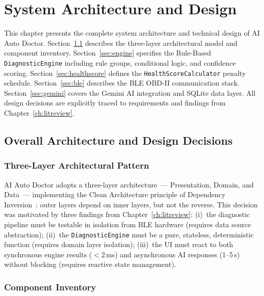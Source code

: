 \chapter{System Architecture and Design}
\label{ch:architecture}

This chapter presents the complete system architecture and technical design of AI Auto Doctor.
Section~\ref{sec:overall_arch} describes the three-layer architectural model and component inventory.
Section~\ref{sec:engine} specifies the Rule-Based \texttt{DiagnosticEngine} including rule groups, conditional logic, and confidence scoring.
Section~\ref{sec:healthscore} defines the \texttt{HealthScoreCalculator} penalty schedule.
Section~\ref{sec:ble} describes the BLE OBD-II communication stack.
Section~\ref{sec:gemini} covers the Gemini AI integration and SQLite data layer.
All design decisions are explicitly traced to requirements and findings from Chapter~\ref{ch:litreview}.

\section{Overall Architecture and Design Decisions}
\label{sec:overall_arch}

\subsection{Three-Layer Architectural Pattern}

AI Auto Doctor adopts a three-layer architecture~--- Presentation, Domain, and Data~--- implementing the Clean Architecture principle of Dependency Inversion~\cite{martin2017}: outer layers depend on inner layers, but not the reverse.
This decision was motivated by three findings from Chapter~\ref{ch:litreview}:
(i)~the diagnostic pipeline must be testable in isolation from BLE hardware (requires data source abstraction);
(ii)~the \texttt{DiagnosticEngine} must be a pure, stateless, deterministic function (requires domain layer isolation);
(iii)~the UI must react to both synchronous engine results ($<$2\,ms) and asynchronous AI responses (1--5\,s) without blocking (requires reactive state management).


\subsection{Component Inventory}

